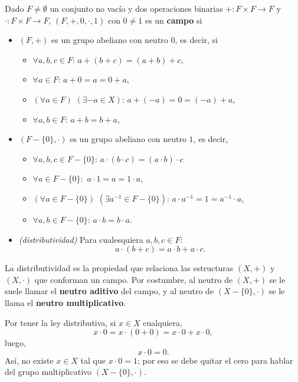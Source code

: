 \begin{defi}
Dado $F \neq \emptyset$ un conjunto no vacío y dos operaciones binarias
$+ : F \times F \longrightarrow F$ y $\cdot: F \times F \longrightarrow F$,
$(F, +, 0, \cdot, 1)$ con $0 \neq 1$ es un \textbf{campo} si 
\begin{itemize}
	\item $(F, +)$ es un grupo abeliano con neutro $0$, es decir, si 
	\begin{itemize}
		\item $\forall a, b, c \in F$: $a + (b + c) = (a + b) + c$,
		\item $\forall a \in F$: $a + 0 = a = 0 + a$,
		\item $(\forall a \in F)$ $(\exists -a \in X)$: $a + (-a) = 0 = (-a) + a$,
		\item $\forall a, b \in F$: $a + b = b + a$,
	\end{itemize}
	\item $(F- \{ 0 \}, \cdot)$ es un grupo abeliano con neutro $1$, es decir,
	\begin{itemize}
		\item $\forall a, b, c \in F-\{0\}$: $a \cdot (b \cdot c) = (a \cdot b) \cdot c$
		\item $\forall a \in F - \{0\}:$ $a \cdot 1 = a = 1 \cdot a$,
		\item $(\forall a \in F - \{0\})$ $(\exists a^{-1} \in F- \{0\})$:
		$a \cdot a^{-1} = 1 = a^{-1} \cdot a$,
		\item $\forall a, b \in F - \{0\}$: $a \cdot b = b \cdot a$.
	\end{itemize}
	\item \textit{(distributividad)} 
	Para cualesquiera $a, b, c \in F$:
	\begin{equation}
		\label{eq: campo distrib}
		a \cdot (b + c) = a \cdot b + a \cdot c.
	\end{equation}
\end{itemize} 
\end{defi}
La distributividad es la propiedad que relaciona las estructuras
$(X, +)$ y $(X, \cdot)$ que conforman un campo. Por costumbre,
al neutro de $(X, +)$ se le suele llamar el \textbf{neutro aditivo}
del campo, y al neutro de $(X-\{ 0 \}, \cdot)$ se le llama el
\textbf{neutro multiplicativo}.

Por tener la ley distributiva, si $x \in X$ cualquiera,
\[
x \cdot 0 = x \cdot (0 + 0) = x \cdot 0 + x \cdot 0,
\]
luego, 
\[
x \cdot 0 = 0.
\]
Así, no existe $x \in X$ tal que $x \cdot 0 = 1$; por eso 
se debe quitar el cero para hablar del grupo multiplicativo
$(X- \{ 0 \}, \cdot)$.

